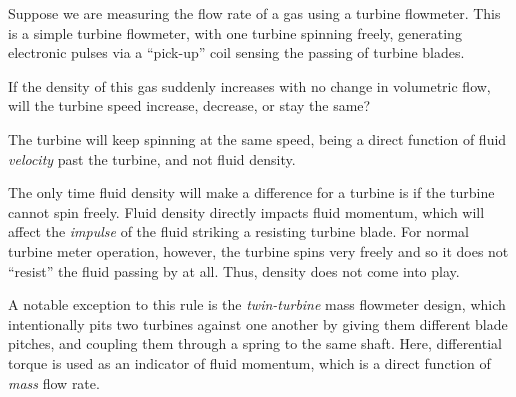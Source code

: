 

Suppose we are measuring the flow rate of a gas using a turbine flowmeter.  This is a simple turbine flowmeter, with one turbine spinning freely, generating electronic pulses via a ``pick-up'' coil sensing the passing of turbine blades.  

\vskip 10pt

If the density of this gas suddenly increases with no change in volumetric flow, will the turbine speed increase, decrease, or stay the same?














The turbine will keep spinning at the same speed, being a direct function of fluid {\it velocity} past the turbine, and not fluid density.

\vskip 10pt

The only time fluid density will make a difference for a turbine is if the turbine cannot spin freely.  Fluid density directly impacts fluid momentum, which will affect the {\it impulse} of the fluid striking a resisting turbine blade.  For normal turbine meter operation, however, the turbine spins very freely and so it does not ``resist'' the fluid passing by at all.  Thus, density does not come into play.

A notable exception to this rule is the {\it twin-turbine} mass flowmeter design, which intentionally pits two turbines against one another by giving them different blade pitches, and coupling them through a spring to the same shaft.  Here, differential torque is used as an indicator of fluid momentum, which is a direct function of {\it mass} flow rate.




